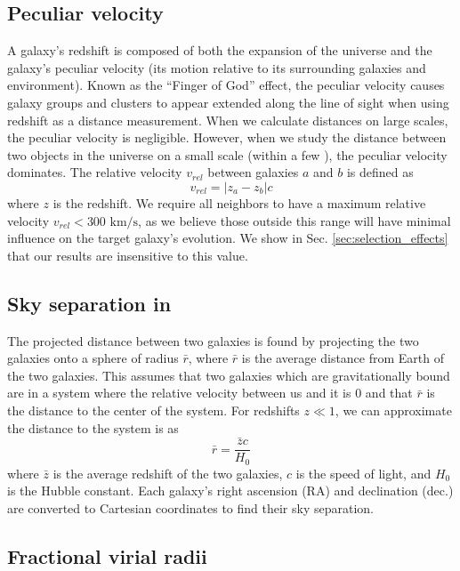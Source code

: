 \subsection{Peculiar velocity}

A galaxy's redshift is composed of both the expansion of the universe and the 
galaxy's peculiar velocity (its motion relative to its surrounding galaxies and 
environment).  Known as the ``Finger of God'' effect, the peculiar velocity 
causes galaxy groups and clusters to appear extended along the line of sight 
when using redshift as a distance measurement.  When we calculate distances on 
large scales, the peculiar velocity is negligible.  However, when we study the 
distance between two objects in the universe on a small scale (within a few 
\hMpc), the peculiar velocity dominates.  The relative velocity $v_{rel}$ 
between galaxies $a$ and $b$ is defined as
\begin{equation}
    v_{rel} = |z_a - z_b|c
\end{equation}
where $z$ is the redshift.  We require all 
neighbors to have a maximum relative velocity $v_{rel} < 300\text{ km/s}$, as we 
believe those outside this range will have minimal influence on the target 
galaxy's evolution.  We show in Sec. \ref{sec:selection_effects} that our 
results are insensitive to this value.


\subsection{Sky separation in \hMpc}

The projected distance between two galaxies is found by projecting the two 
galaxies onto a sphere of radius $\bar{r}$, where $\bar{r}$ is the average 
distance from Earth of the two galaxies.  This assumes that two galaxies which 
are gravitationally bound are in a system where the relative velocity between us 
and it is 0 and that $\bar{r}$ is the distance to the center of the system.  For 
redshifts $z \ll 1$, we can approximate the distance to the system is as
\begin{equation}
    \bar{r} = \frac{\bar{z}c}{H_0}
\end{equation}
where $\bar{z}$ is the average redshift of the two galaxies, $c$ is the speed of 
light, and $H_0$ is the Hubble constant.  Each galaxy's right ascension (RA) and 
declination (dec.) are converted to Cartesian coordinates to find their sky 
separation.


\subsection{Fractional virial radii}

